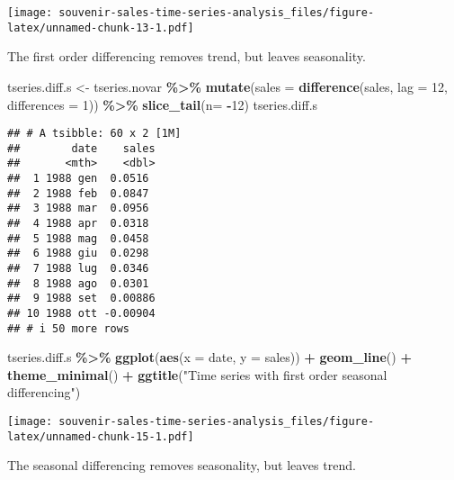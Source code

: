 \documentclass[
]{article}
\newenvironment{Shaded}{\begin{snugshade}}{\end{snugshade}}
\newcommand{\AttributeTok}[1]{\textcolor[rgb]{0.13,0.29,0.53}{#1}}
\newcommand{\DecValTok}[1]{\textcolor[rgb]{0.00,0.00,0.81}{#1}}
\newcommand{\FunctionTok}[1]{\textcolor[rgb]{0.13,0.29,0.53}{\textbf{#1}}}
\newcommand{\NormalTok}[1]{#1}
\newcommand{\OtherTok}[1]{\textcolor[rgb]{0.56,0.35,0.01}{#1}}
\newcommand{\SpecialCharTok}[1]{\textcolor[rgb]{0.81,0.36,0.00}{\textbf{#1}}}
\newcommand{\StringTok}[1]{\textcolor[rgb]{0.31,0.60,0.02}{#1}}
\begin{document}
\texttt{[image: souvenir-sales-time-series-analysis\_files/figure-latex/unnamed-chunk-13-1.pdf]}

The first order differencing removes trend, but leaves seasonality.

\begin{Shaded}
\begin{Highlighting}[]
\NormalTok{tseries.diff.s }\OtherTok{\textless{}{-}}\NormalTok{ tseries.novar }\SpecialCharTok{\%\textgreater{}\%}
  \FunctionTok{mutate}\NormalTok{(}\AttributeTok{sales =} \FunctionTok{difference}\NormalTok{(sales, }\AttributeTok{lag =} \DecValTok{12}\NormalTok{, }\AttributeTok{differences =} \DecValTok{1}\NormalTok{)) }\SpecialCharTok{\%\textgreater{}\%}
  \FunctionTok{slice\_tail}\NormalTok{(}\AttributeTok{n=} \SpecialCharTok{{-}}\DecValTok{12}\NormalTok{)}
\NormalTok{tseries.diff.s}
\end{Highlighting}
\end{Shaded}

\begin{verbatim}
## # A tsibble: 60 x 2 [1M]
##        date    sales
##       <mth>    <dbl>
##  1 1988 gen  0.0516 
##  2 1988 feb  0.0847 
##  3 1988 mar  0.0956 
##  4 1988 apr  0.0318 
##  5 1988 mag  0.0458 
##  6 1988 giu  0.0298 
##  7 1988 lug  0.0346 
##  8 1988 ago  0.0301 
##  9 1988 set  0.00886
## 10 1988 ott -0.00904
## # i 50 more rows
\end{verbatim}

\begin{Shaded}
\begin{Highlighting}[]
\NormalTok{tseries.diff.s }\SpecialCharTok{\%\textgreater{}\%}
  \FunctionTok{ggplot}\NormalTok{(}\FunctionTok{aes}\NormalTok{(}\AttributeTok{x =}\NormalTok{ date, }\AttributeTok{y =}\NormalTok{ sales)) }\SpecialCharTok{+}
  \FunctionTok{geom\_line}\NormalTok{() }\SpecialCharTok{+}
  \FunctionTok{theme\_minimal}\NormalTok{() }\SpecialCharTok{+}
  \FunctionTok{ggtitle}\NormalTok{(}\StringTok{"Time series with first order seasonal differencing"}\NormalTok{)}
\end{Highlighting}
\end{Shaded}

\texttt{[image: souvenir-sales-time-series-analysis\_files/figure-latex/unnamed-chunk-15-1.pdf]}

The seasonal differencing removes seasonality, but leaves trend.
\end{document}
